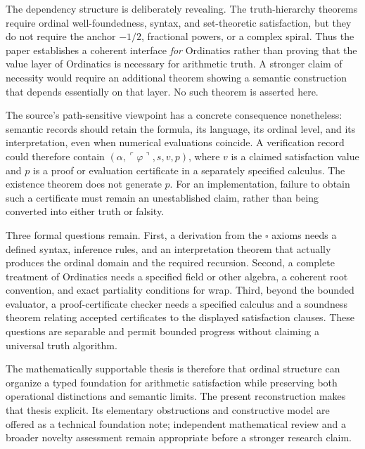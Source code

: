 \documentclass[11pt]{article}
\theoremstyle{definition}
\newcommand{\code}[1]{\ulcorner #1\urcorner}
\begin{document}
The dependency structure is deliberately revealing. The truth-hierarchy theorems require ordinal well-foundedness, syntax, and set-theoretic satisfaction, but they do not require the anchor $-1/2$, fractional powers, or a complex spiral. Thus the paper establishes a coherent interface \emph{for} Ordinatics rather than proving that the value layer of Ordinatics is necessary for arithmetic truth. A stronger claim of necessity would require an additional theorem showing a semantic construction that depends essentially on that layer. No such theorem is asserted here.

The source's path-sensitive viewpoint has a concrete consequence nonetheless: semantic records should retain the formula, its language, its ordinal level, and its interpretation, even when numerical evaluations coincide. A verification record could therefore contain $(\alpha,\code{\varphi},s,v,p)$, where $v$ is a claimed satisfaction value and $p$ is a proof or evaluation certificate in a separately specified calculus. The existence theorem does not generate $p$. For an implementation, failure to obtain such a certificate must remain an unestablished claim, rather than being converted into either truth or falsity.

Three formal questions remain. First, a derivation from the $\square$ axioms needs a defined syntax, inference rules, and an interpretation theorem that actually produces the ordinal domain and the required recursion. Second, a complete treatment of Ordinatics needs a specified field or other algebra, a coherent root convention, and exact partiality conditions for wrap. Third, beyond the bounded evaluator, a proof-certificate checker needs a specified calculus and a soundness theorem relating accepted certificates to the displayed satisfaction clauses. These questions are separable and permit bounded progress without claiming a universal truth algorithm.

The mathematically supportable thesis is therefore that ordinal structure can organize a typed foundation for arithmetic satisfaction while preserving both operational distinctions and semantic limits. The present reconstruction makes that thesis explicit. Its elementary obstructions and constructive model are offered as a technical foundation note; independent mathematical review and a broader novelty assessment remain appropriate before a stronger research claim.
\end{document}
